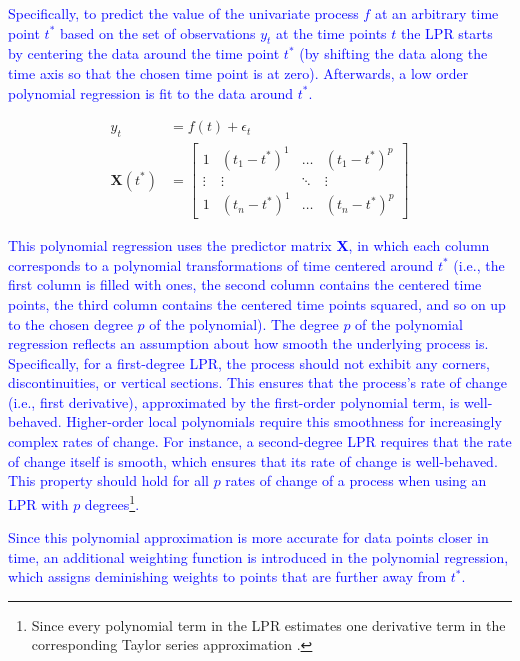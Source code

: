 \documentclass[man, floatsintext]{apa7}
\begin{document}
\textcolor{blue}{
  Specifically, to predict the value of the univariate process $f$ at an
  arbitrary time point $t^*$ based on the set of observations $y_t$ at the time
  points $t$ the LPR starts by centering the data around the time point $t^*$
  (by shifting the data along the time axis so that the chosen time point is at
  zero). Afterwards, a low order polynomial regression is fit to the data
  around $t^*$.
}

\begin{align}
  y_t             & = f(t) + \epsilon_t \\
  \textbf{X}(t^*) & =
  \begin{bmatrix}
    1      & (t_1 - t^*)^1 & \dots  & (t_1 - t^*)^p \\
    \vdots & \vdots        & \ddots & \vdots        \\
    1      & (t_n - t^*)^1 & \dots  & (t_n - t^*)^p
  \end{bmatrix}
  \label{eq:lpr_equations_mod_mat}
\end{align}

\noindent\textcolor{blue}{
  This polynomial regression uses the predictor matrix $\textbf{X}$, in which
  each column corresponds to a polynomial transformations of time centered
  around $t^*$ (i.e., the first column is filled with ones, the second column
  contains the centered time points, the third column contains the centered
  time points squared, and so on up to the chosen degree $p$ of the
  polynomial). The degree $p$ of the polynomial regression reflects an
  assumption about how smooth the underlying process is. Specifically, for a
  first-degree LPR, the process should not exhibit any corners,
  discontinuities, or vertical sections. This ensures that the process's rate
  of change (i.e., first derivative), approximated by the first-order
  polynomial term, is well-behaved. Higher-order local polynomials require this
  smoothness for increasingly complex rates of change. For instance, a
  second-degree LPR requires that the rate of change itself is smooth, which
  ensures that its rate of change is well-behaved. This property should hold
  for all $p$ rates of change of a process when using an LPR with $p$
  degrees\footnote{Since every polynomial term in the LPR estimates one
    derivative term in the corresponding Taylor series approximation
    \parencite{avery_literature_nodate}.}.
}

\textcolor{blue}{
  Since this polynomial approximation is more accurate for data points closer
  in time, an additional weighting function is introduced in the polynomial
  regression, which assigns deminishing weights to points that are further away
  from $t^*$.
}
\end{document}
